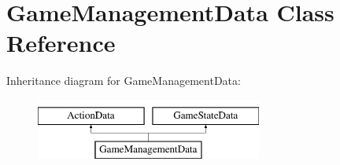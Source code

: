 \hypertarget{class_game_management_data}{\section{Game\+Management\+Data Class Reference}
\label{class_game_management_data}
}
Inheritance diagram for Game\+Management\+Data\+:\begin{figure}[H]
\begin{center}
\leavevmode
\includegraphics[height=2.000000cm]{class_game_management_data}
\end{center}
\end{figure}
